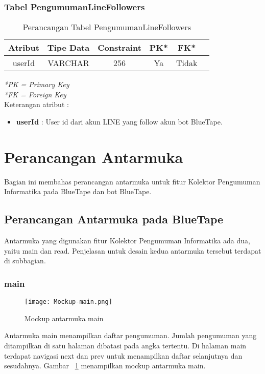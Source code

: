 \subsubsection{Tabel PengumumanLineFollowers}
\begin{center}
	\begin{table}[H]
	\caption{Perancangan Tabel PengumumanLineFollowers}
	\begin{tabular}{|c|c|c|c|c|c|}
 			\hline
			\textbf{Atribut} & \textbf{Tipe Data} & \textbf{Constraint} & \textbf{PK*}  & \textbf{FK*} \\
			\hline
			 userId & VARCHAR & 256 & Ya & Tidak\\
            \hline
	\end{tabular}
	\end{table}
\end{center}
\textit{*PK = Primary Key} \\
\textit{*FK = Foreign Key} \\

Keterangan atribut :
\begin{itemize}
\item \textbf{userId} : User id dari akun LINE yang follow akun bot BlueTape.
\end{itemize}

\section{Perancangan Antarmuka}
	Bagian ini membahas perancangan antarmuka untuk fitur Kolektor Pengumuman Informatika pada BlueTape dan bot BlueTape.
\subsection{Perancangan Antarmuka pada BlueTape}
Antarmuka yang digunakan fitur Kolektor Pengumuman Informatika ada dua, yaitu main dan read. Penjelasan untuk desain kedua antarmuka tersebut terdapat di subbagian.

\subsubsection{main}

\begin{figure}[H]
	\centering  
	\texttt{[image: Mockup-main.png]}  
	\caption[Mockup antarmuka main]{Mockup antarmuka main} 
	\label{fig:mockup-main} 
\end{figure}

Antarmuka main menampilkan daftar pengumuman. Jumlah pengumuman yang ditampilkan di satu halaman dibatasi pada angka tertentu. Di halaman main terdapat navigasi next dan prev untuk menampilkan daftar selanjutnya dan sesudahnya. Gambar~ \ref{fig:mockup-main} menampilkan mockup antarmuka main.

